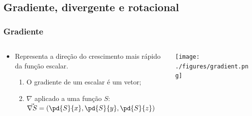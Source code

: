 \subsection{Gradiente, divergente e rotacional}
\begin{frame}
\frametitle{Gradiente}

  \begin{columns}
    \begin{column}{0.5\textwidth}
        \begin{itemize}[<+-| alert@+>]
          \item Representa a direção do crescimento mais rápido da função
                escalar.
            \begin{enumerate}[<+-| alert@+>]
              \item O gradiente de um escalar é um vetor;
              \item $\nabla$ aplicado a uma função $S$:
                    $\vec{\nabla S} = \left(\pd{S}{x}, \pd{S}{y}, \pd{S}{z}
                    \right)$
            \end{enumerate}
        \end{itemize}
    \end{column}
  \pause
    \begin{column}{0.5\textwidth}
      \begin{center}
        \texttt{[image: ./figures/gradient.png]}
      \end{center}
    \end{column}
  \end{columns}

\end{frame}


